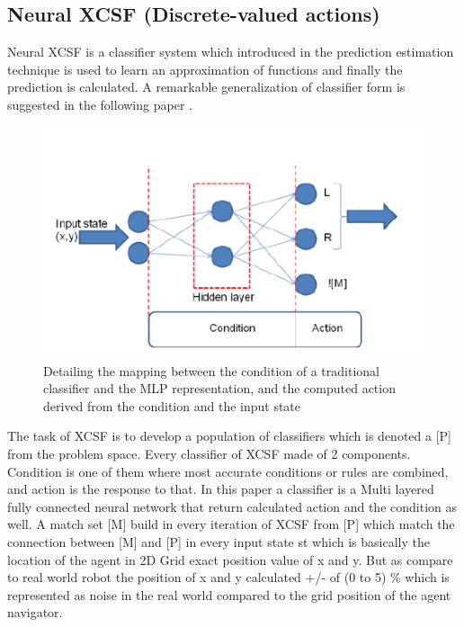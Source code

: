\documentclass[12pt]{article}
\begin{document}
\subsection{Neural XCSF (Discrete-valued actions)}
\label{sec:2}
Neural XCSF is a classifier system which introduced in the prediction estimation technique is used to learn an approximation of functions and finally the prediction is calculated. A remarkable generalization of classifier form is suggested in the following paper \cite{WilsonPrediction2001FunctionAW}.   
\begin{figure}[!htbp]
\begin{center}
\includegraphics[width=6in]{fig_2.PNG}
\end{center}
\caption{Detailing the mapping between the condition of a traditional classifier and the MLP representation, and the computed action derived from the condition and the input state \label{fig:first}}
\end{figure}
The task of XCSF is to develop a population of classifiers which is denoted a [P] from the problem space. Every classifier of XCSF made of 2 components. Condition is one of them where most accurate conditions or rules are combined, and action is the response to that. In this paper a classifier is a Multi layered fully connected neural network that return calculated action and the condition as well. A match set [M] build in every iteration of XCSF from [P] which match the connection between [M] and [P] in every input state st which is basically the location of the agent in 2D Grid exact position value of x and y. But as compare to real world robot the position of x and y calculated +/- of (0 to 5) \% which is represented as noise in the real world compared to the grid position of the agent navigator. 
\end{document}
